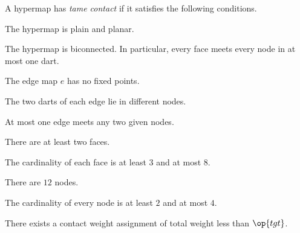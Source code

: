 \begin{definition}
  A hypermap has {\it tame contact\/} if it satisfies the following
  conditions.
%
%
%
%
%
%
%
%
%
\begin{description}
\item {} The hypermap is plain and planar.
\item {} The hypermap is biconnected.  In particular,
  every face meets every node in at most one dart.
\item {} The edge map $e$ has no fixed points.
\item {} The two darts of each edge lie in different
  nodes.
\item {} At most one edge meets any two given
  nodes.
\item {} There are at least two faces.
\item {} The cardinality of each face is at least $3$
  and at most $8$.
\item {} There are $12$ nodes.
\item {} The cardinality of every node is at least $2$
  and at most $4$.
\item {} There exists a contact weight assignment of total
  weight less than $\op{tgt}$.
\end{description}
%
\end{definition}


